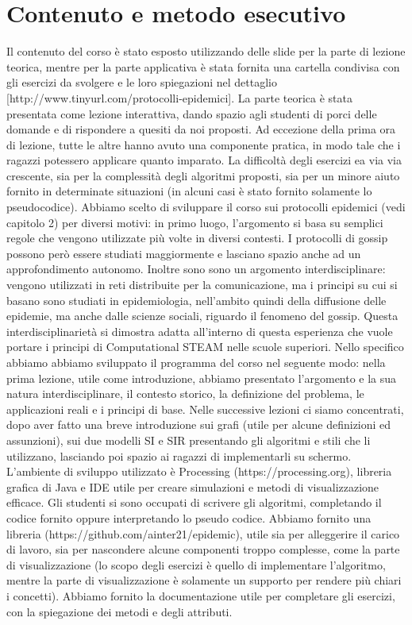 \section{Contenuto e metodo esecutivo} 
Il contenuto del corso è stato esposto utilizzando delle slide per la parte di lezione teorica, mentre per la parte applicativa è stata fornita una cartella condivisa con gli esercizi da svolgere e le loro spiegazioni nel dettaglio [http://www.tinyurl.com/protocolli-epidemici]. La parte teorica è stata presentata come lezione interattiva, dando spazio agli studenti di porci delle domande e di rispondere a quesiti da noi proposti. Ad eccezione della prima ora di lezione, tutte le altre hanno avuto una componente pratica, in modo tale che i ragazzi potessero applicare quanto imparato. La difficoltà degli esercizi ea via via crescente, sia per la complessità degli algoritmi proposti, sia per un minore aiuto fornito in determinate situazioni (in alcuni casi è stato fornito solamente lo pseudocodice). 
Abbiamo scelto di sviluppare il corso sui protocolli epidemici (vedi capitolo 2) per diversi motivi: in primo luogo, l’argomento si basa su semplici regole che vengono utilizzate più volte in diversi contesti. I protocolli di gossip possono però essere studiati maggiormente e lasciano spazio anche ad un approfondimento autonomo. Inoltre sono sono un argomento interdisciplinare: vengono utilizzati in reti distribuite per la comunicazione, ma i principi su cui si basano sono studiati in epidemiologia, nell’ambito quindi della diffusione delle epidemie, ma anche dalle scienze sociali, riguardo il fenomeno del gossip. Questa interdisciplinarietà si dimostra adatta all’interno di questa esperienza che vuole portare i principi di Computational STEAM nelle scuole superiori.
Nello specifico abbiamo abbiamo sviluppato il programma del corso nel seguente modo: nella prima lezione, utile come introduzione, abbiamo presentato l’argomento e la sua natura interdisciplinare, il contesto storico, la definizione del problema, le applicazioni reali e i principi di base.
Nelle successive lezioni ci siamo concentrati, dopo aver fatto una breve introduzione sui grafi (utile per alcune definizioni ed assunzioni), sui due modelli SI e SIR presentando gli algoritmi e stili che li utilizzano, lasciando poi spazio ai ragazzi di implementarli su schermo. L’ambiente di sviluppo utilizzato è Processing (https://processing.org), libreria grafica di Java e IDE utile per creare simulazioni e metodi di visualizzazione efficace. Gli studenti si sono occupati di scrivere gli algoritmi, completando il codice fornito oppure interpretando lo pseudo codice. Abbiamo fornito una libreria (https://github.com/ainter21/epidemic), utile sia per alleggerire il carico di lavoro, sia per nascondere alcune componenti troppo complesse, come la parte di visualizzazione (lo scopo degli esercizi è quello di implementare l’algoritmo, mentre la parte di visualizzazione è solamente un supporto per rendere più chiari i concetti).
Abbiamo fornito la documentazione utile per completare gli esercizi, con la spiegazione dei metodi e degli attributi. 
